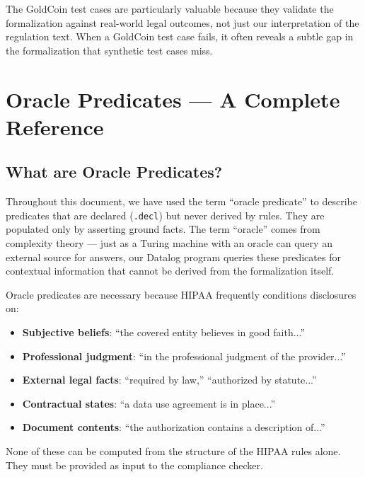 \documentclass[11pt,letterpaper]{article}
\begin{document}
\begin{designbox}
The GoldCoin test cases are particularly valuable because they validate the formalization against real-world legal outcomes, not just our interpretation of the regulation text. When a GoldCoin test case fails, it often reveals a subtle gap in the formalization that synthetic test cases miss.
\end{designbox}


\section{Oracle Predicates --- A Complete Reference}
\label{sec:oracle-reference}

\subsection{What are Oracle Predicates?}

Throughout this document, we have used the term ``oracle predicate'' to describe predicates that are declared (\texttt{.decl}) but never derived by rules. They are populated only by asserting ground facts. The term ``oracle'' comes from complexity theory --- just as a Turing machine with an oracle can query an external source for answers, our Datalog program queries these predicates for contextual information that cannot be derived from the formalization itself.

Oracle predicates are necessary because HIPAA frequently conditions disclosures on:
\begin{itemize}
  \item \textbf{Subjective beliefs}: ``the covered entity believes in good faith...''
  \item \textbf{Professional judgment}: ``in the professional judgment of the provider...''
  \item \textbf{External legal facts}: ``required by law,'' ``authorized by statute...''
  \item \textbf{Contractual states}: ``a data use agreement is in place...''
  \item \textbf{Document contents}: ``the authorization contains a description of...''
\end{itemize}

None of these can be computed from the structure of the HIPAA rules alone. They must be provided as input to the compliance checker.
\end{document}
